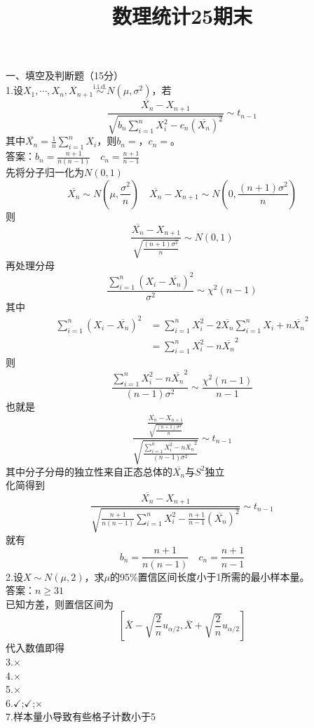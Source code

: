 \documentclass[UTF8]{ctexart}
\title{数理统计25期末}
\author{}
\date{}
\begin{document}
\maketitle
\noindent 一、填空及判断题（15分）\\
1.设$X_1, \cdots, X_n, X_{n+1} \stackrel{\text{i.i.d.}}{\sim} N(\mu, \sigma^2)$，若
    \[
    \frac{\overline{X_n}-X_{n+1}}{\sqrt{b_n \sum_{i=1}^n X_i^2 - c_n (\overline{X_n})^2}} \sim t_{n-1}
    \]
    其中$\overline{X_n}=\frac{1}{n}\sum_{i=1}^n X_i$，则$b_n=$\underline{\hspace{2cm}}，$c_n=$\underline{\hspace{2cm}}。\\
答案：$b_n=\frac{n+1}{n(n-1)} \quad c_n=\frac{n+1}{n-1}$\\
先将分子归一化为$N(0,1)$
\[
\overline{X_n}\sim N\left( \mu,\frac{\sigma^2}{n}\right)  \quad \overline{X_n}-X_{n+1}\sim N\left( 0,\frac{(n+1)\sigma^2}{n}\right) 
\]
则
\[
\frac{\overline{X_n}-X_{n+1}}{\sqrt{\frac{(n+1)\sigma^2}{n}}} \sim N(0,1)
\]
再处理分母
\[
\frac{\sum\limits_{i=1}^{n} \left( X_i-\overline{X_n}\right)^2}{\sigma^2}\sim \chi^2(n-1)
\]
其中
\begin{align*}
	\sum\limits_{i=1}^{n} \left( X_i-\overline{X_n}\right)^2 &=\sum\limits_{i=1}^{n}X_i^2-2\overline{X_n}\sum\limits_{i=1}^{n}X_i+n\overline{X_n}^2  \\
	 & =\sum\limits_{i=1}^{n}X_i^2-n\overline{X_n}^2
\end{align*}
则
\[
\frac{\sum\limits_{i=1}^{n}X_i^2-n\overline{X_n}^2}{(n-1)\sigma^2}\sim \frac{\chi^2(n-1)}{n-1}
\]
也就是
\[
\frac{\frac{\overline{X_n}-X_{n+1}}{\sqrt{\frac{(n+1)\sigma^2}{n}}}}{\sqrt{\frac{\sum\limits_{i=1}^{n}X_i^2-n\overline{X_n}^2}{(n-1)\sigma^2}}}\sim t_{n-1}
\]
其中分子分母的独立性来自正态总体的$\overline{X_n}$与$S^2$独立\\
化简得到
\[
\frac{\overline{X_n}-X_{n+1}}{\sqrt{\frac{n+1}{n(n-1)} \sum_{i=1}^n X_i^2 - \frac{n+1}{n-1} (\overline{X_n})^2}}\sim t_{n-1}
\]
就有
\[
b_n=\frac{n+1}{n(n-1)} \quad c_n=\frac{n+1}{n-1}
\]
2.设$X \sim N(\mu, 2)$，求$\mu$的95\%置信区间长度小于1所需的最小样本量\underline{\hspace{2cm}}。\\
答案：$n \geq 31$\\
已知方差，则置信区间为
\[
\left[\overline{X}-\sqrt{\frac{2}{n}}u_{\alpha/2},\overline{X}+\sqrt{\frac{2}{n}}u_{\alpha/2} \right] 
\]
代入数值即得\\
3.$\times$\\
4.$\times$\\
5.$\times$\\
6.$\checkmark$;$\checkmark$;$\times$\\
7.样本量小导致有些格子计数小于5\\
\end{document}

